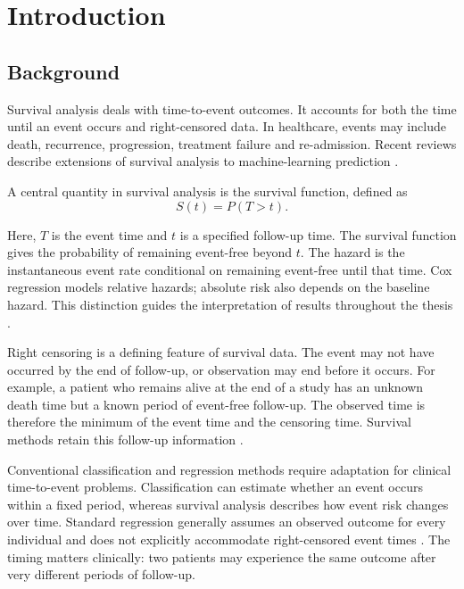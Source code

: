 \chapter{Introduction}\label{introduction}

\section{Background}\label{background}

Survival analysis deals with time-to-event outcomes. It accounts for both the time until an event occurs and right-censored data. In healthcare, events may include death, recurrence, progression, treatment failure and re-admission. Recent reviews describe extensions of survival analysis to machine-learning prediction \cite{ref1,ref3}.

A central quantity in survival analysis is the survival function, defined as
\begin{equation}
    S(t) = P(T > t).
\end{equation}


Here, \(T\) is the event time and \(t\) is a specified follow-up time. The survival function gives the probability of remaining event-free beyond \(t\). The hazard is the instantaneous event rate conditional on remaining event-free until that time. Cox regression models relative hazards; absolute risk also depends on the baseline hazard. This distinction guides the interpretation of results throughout the thesis \cite{ref14,cox1972}.

Right censoring is a defining feature of survival data. The event may not have occurred by the end of follow-up, or observation may end before it occurs. For example, a patient who remains alive at the end of a study has an unknown death time but a known period of event-free follow-up. The observed time is therefore the minimum of the event time and the censoring time. Survival methods retain this follow-up information \cite{ref14,ref3}.

Conventional classification and regression methods require adaptation for clinical time-to-event problems. Classification can estimate whether an event occurs within a fixed period, whereas survival analysis describes how event risk changes over time. Standard regression generally assumes an observed outcome for every individual and does not explicitly accommodate right-censored event times \cite{ref3}. The timing matters clinically: two patients may experience the same outcome after very different periods of follow-up.

